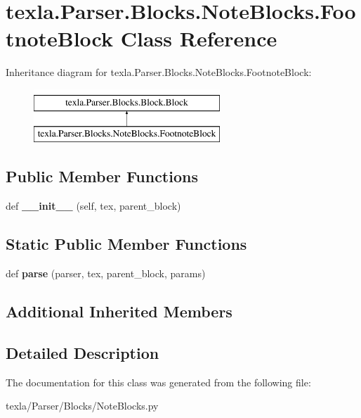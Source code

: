 \hypertarget{classtexla_1_1Parser_1_1Blocks_1_1NoteBlocks_1_1FootnoteBlock}{}\section{texla.\+Parser.\+Blocks.\+Note\+Blocks.\+Footnote\+Block Class Reference}
\label{classtexla_1_1Parser_1_1Blocks_1_1NoteBlocks_1_1FootnoteBlock}
Inheritance diagram for texla.\+Parser.\+Blocks.\+Note\+Blocks.\+Footnote\+Block\+:\begin{figure}[H]
\begin{center}
\leavevmode
\includegraphics[height=2.000000cm]{classtexla_1_1Parser_1_1Blocks_1_1NoteBlocks_1_1FootnoteBlock}
\end{center}
\end{figure}
\subsection*{Public Member Functions}
\begin{DoxyCompactItemize}
\item 
\hypertarget{classtexla_1_1Parser_1_1Blocks_1_1NoteBlocks_1_1FootnoteBlock_aea7afb002614e686bc3d986e391cd389}{}\label{classtexla_1_1Parser_1_1Blocks_1_1NoteBlocks_1_1FootnoteBlock_aea7afb002614e686bc3d986e391cd389} 
def {\bfseries \+\_\+\+\_\+init\+\_\+\+\_\+} (self, tex, parent\+\_\+block)
\end{DoxyCompactItemize}
\subsection*{Static Public Member Functions}
\begin{DoxyCompactItemize}
\item 
\hypertarget{classtexla_1_1Parser_1_1Blocks_1_1NoteBlocks_1_1FootnoteBlock_acc57481997336bc8f78617fa7d76b9ab}{}\label{classtexla_1_1Parser_1_1Blocks_1_1NoteBlocks_1_1FootnoteBlock_acc57481997336bc8f78617fa7d76b9ab} 
def {\bfseries parse} (parser, tex, parent\+\_\+block, params)
\end{DoxyCompactItemize}
\subsection*{Additional Inherited Members}


\subsection{Detailed Description}
 

The documentation for this class was generated from the following file\+:\begin{DoxyCompactItemize}
\item 
texla/\+Parser/\+Blocks/Note\+Blocks.\+py\end{DoxyCompactItemize}
